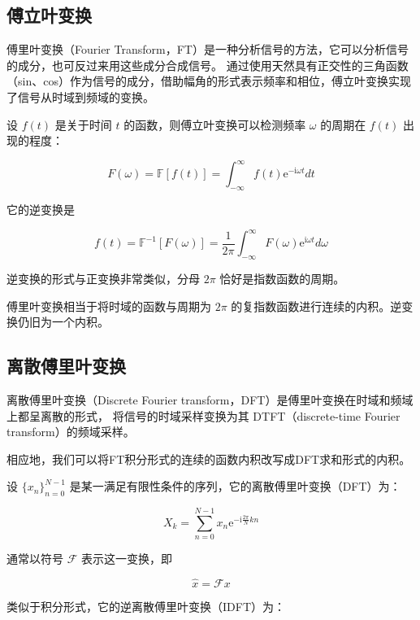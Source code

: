 \documentclass[12pt,a4paper]{article}
\begin{document}
\subsection{傅立叶变换}
傅里叶变换（Fourier Transform，FT）是一种分析信号的方法，它可以分析信号的成分，也可反过来用这些成分合成信号。
通过使用天然具有正交性的三角函数（sin、cos）作为信号的成分，借助幅角的形式表示频率和相位，傅立叶变换实现了信号从时域到频域的变换。

设 $f(t)$ 是关于时间 $t$ 的函数，则傅立叶变换可以检测频率 $\omega$ 的周期在 $f(t)$ 出现的程度：

\begin{equation}
F(\omega)=\mathbb{F}[f(t)]=\int_{-\infty}^{\infty}f(t)\mathrm{e}^{-\mathrm{i}{\omega}t}dt
\end{equation}

它的逆变换是

\begin{equation}
f(t)=\mathbb{F}^{-1}[F(\omega)]=\frac{1}{2\pi}\int_{-\infty}^{\infty}F(\omega)\mathrm{e}^{\mathrm{i}{\omega}t}d\omega
\end{equation}

逆变换的形式与正变换非常类似，分母 $2\pi$ 恰好是指数函数的周期。

傅里叶变换相当于将时域的函数与周期为 $2\pi$ 的复指数函数进行连续的内积。逆变换仍旧为一个内积。

\subsection{离散傅里叶变换}
离散傅里叶变换（Discrete Fourier transform，DFT）是傅里叶变换在时域和频域上都呈离散的形式，
将信号的时域采样变换为其 DTFT（discrete-time Fourier transform）的频域采样。

相应地，我们可以将FT积分形式的连续的函数内积改写成DFT求和形式的内积。

设 $\{x_n\}_{n=0}^{N-1}$ 是某一满足有限性条件的序列，它的离散傅里叶变换（DFT）为：

\begin{equation}
X_k=\sum_{n=0}^{N-1}x_n\mathrm{e}^{-\mathrm{i}\frac{2\pi}{N}kn}
\end{equation}

通常以符号 $\mathcal {F}$ 表示这一变换，即

\begin{equation}
\hat{x}=\mathcal{F}x
\end{equation}

类似于积分形式，它的逆离散傅里叶变换（IDFT）为：
\end{document}

